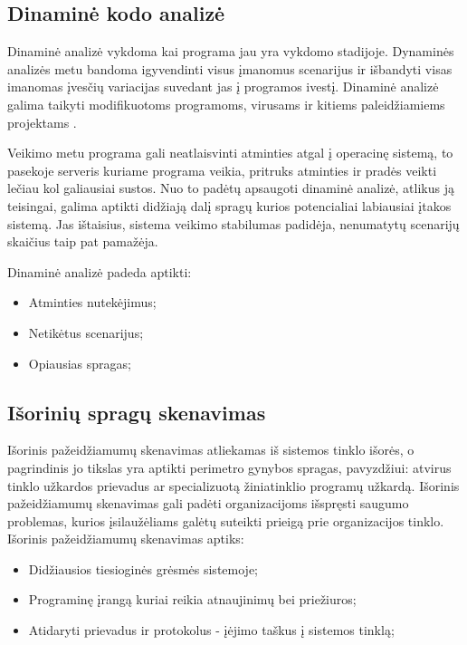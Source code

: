 \documentclass[a4paper,12pt,fleqn]{article}
\begin{document}
\subsection{Dinaminė kodo analizė}
\label{sec:example}


\label{sec:data}
Dinaminė analizė vykdoma kai programa jau yra vykdomo stadijoje. Dynaminės analizės metu bandoma igyvendinti visus įmanomus scenarijus ir išbandyti visas imanomas įvesčių variacijas suvedant jas į programos ivestį. Dinaminė analizė galima taikyti modifikuotoms programoms, virusams ir kitiems paleidžiamiems projektams \cite{bayer2006dynamic}.

Veikimo metu programa gali neatlaisvinti atminties atgal į operacinę sistemą, to pasekoje serveris kuriame programa veikia, pritruks atminties ir pradės veikti lečiau kol galiausiai sustos. Nuo to padėtų apsaugoti dinaminė analizė, atlikus ją teisingai, galima aptikti didžiają dalį spragų kurios potencialiai labiausiai įtakos sistemą. Jas ištaisius, sistema veikimo stabilumas padidėja, nenumatytų scenarijų skaičius taip pat pamažėja.

Dinaminė analizė padeda aptikti:
\begin{itemize}
	\item Atminties nutekėjimus;
	\item Netikėtus scenarijus;
	\item Opiausias spragas;
\end{itemize}

\subsection{Išorinių spragų skenavimas}
\label{sec:example}

Išorinis pažeidžiamumų skenavimas atliekamas iš sistemos tinklo išorės, o pagrindinis jo tikslas yra aptikti perimetro gynybos spragas, pavyzdžiui: atvirus tinklo užkardos prievadus ar specializuotą žiniatinklio programų užkardą\cite{gula1999passive}. Išorinis pažeidžiamumų skenavimas gali padėti organizacijoms išspręsti saugumo problemas, kurios įsilaužėliams galėtų suteikti prieigą prie organizacijos tinklo.
\newline
Išorinis pažeidžiamumų skenavimas aptiks:
\begin{itemize}
	\item Didžiausios tiesioginės grėsmės sistemoje;
	\item Programinę įrangą kuriai reikia atnaujinimų bei priežiuros;
	\item Atidaryti prievadus ir protokolus - įėjimo taškus į sistemos tinklą;
\end{itemize}
\end{document}
